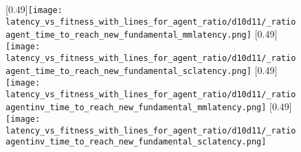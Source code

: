    \begin{figure}
   	\centering
   	\subcaptionbox{\overshoot}[0.49\linewidth]{\texttt{[image: latency\_vs\_fitness\_with\_lines\_for\_agent\_ratio/d10d11/\_ratioagent\_time\_to\_reach\_new\_fundamental\_mmlatency.png]}}
   	\subcaptionbox{\overshoot}[0.49\linewidth]{\texttt{[image: latency\_vs\_fitness\_with\_lines\_for\_agent\_ratio/d10d11/\_ratioagent\_time\_to\_reach\_new\_fundamental\_sclatency.png]}}
   	\subcaptionbox{\overshoot}[0.49\linewidth]{\texttt{[image: latency\_vs\_fitness\_with\_lines\_for\_agent\_ratio/d10d11/\_ratioagentinv\_time\_to\_reach\_new\_fundamental\_mmlatency.png]}}
   	\subcaptionbox{\overshoot}[0.49\linewidth]{\texttt{[image: latency\_vs\_fitness\_with\_lines\_for\_agent\_ratio/d10d11/\_ratioagentinv\_time\_to\_reach\_new\_fundamental\_sclatency.png]}}
  	\caption{}
   \end{figure}
